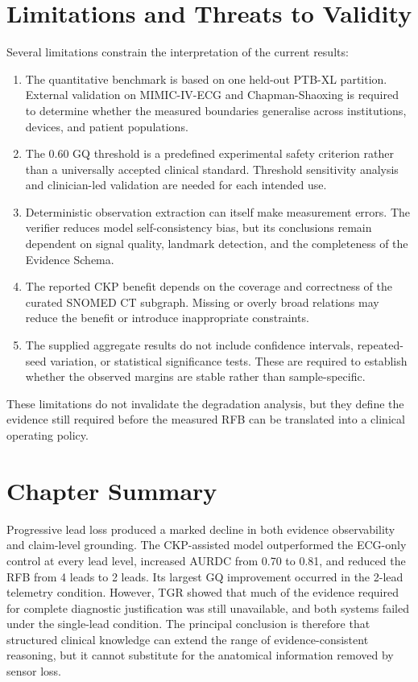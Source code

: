 \documentclass{ssnreview}
\begin{document}
\section{Limitations and Threats to Validity}

Several limitations constrain the interpretation of the current results:

\begin{enumerate}[label=\arabic*.,leftmargin=*,align=left]
  \item The quantitative benchmark is based on one held-out PTB-XL partition. External
  validation on MIMIC-IV-ECG and Chapman-Shaoxing is required to determine whether the
  measured boundaries generalise across institutions, devices, and patient populations.

  \item The 0.60 GQ threshold is a predefined experimental safety criterion rather than a
  universally accepted clinical standard. Threshold sensitivity analysis and clinician-led
  validation are needed for each intended use.

  \item Deterministic observation extraction can itself make measurement errors. The
  verifier reduces model self-consistency bias, but its conclusions remain dependent on
  signal quality, landmark detection, and the completeness of the Evidence Schema.

  \item The reported CKP benefit depends on the coverage and correctness of the curated
  SNOMED CT subgraph. Missing or overly broad relations may reduce the benefit or introduce
  inappropriate constraints.

  \item The supplied aggregate results do not include confidence intervals, repeated-seed
  variation, or statistical significance tests. These are required to establish whether the
  observed margins are stable rather than sample-specific.
\end{enumerate}

These limitations do not invalidate the degradation analysis, but they define the evidence
still required before the measured RFB can be translated into a clinical operating policy.

\section{Chapter Summary}

Progressive lead loss produced a marked decline in both evidence observability and
claim-level grounding. The CKP-assisted model outperformed the ECG-only control at every
lead level, increased AURDC from 0.70 to 0.81, and reduced the RFB from 4 leads to
2 leads. Its largest GQ improvement occurred in the 2-lead telemetry condition. However,
TGR showed that much of the evidence required for complete diagnostic justification was
still unavailable, and both systems failed under the single-lead condition. The principal
conclusion is therefore that structured clinical knowledge can extend the range of
evidence-consistent reasoning, but it cannot substitute for the anatomical information
removed by sensor loss.
\end{document}
